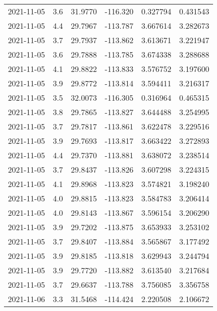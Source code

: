 \begin{tabular}{lrrrrr}
2021-11-05 &       3.6 &  31.9770 &  -116.320 &         0.327794 &         0.431543 \\
2021-11-05 &       4.4 &  29.7967 &  -113.787 &         3.667614 &         3.282673 \\
2021-11-05 &       3.7 &  29.7937 &  -113.862 &         3.613671 &         3.221947 \\
2021-11-05 &       3.6 &  29.7888 &  -113.785 &         3.674338 &         3.288688 \\
2021-11-05 &       4.1 &  29.8822 &  -113.833 &         3.576752 &         3.197600 \\
2021-11-05 &       3.9 &  29.8772 &  -113.814 &         3.594411 &         3.216317 \\
2021-11-05 &       3.5 &  32.0073 &  -116.305 &         0.316964 &         0.465315 \\
2021-11-05 &       3.8 &  29.7865 &  -113.827 &         3.644488 &         3.254995 \\
2021-11-05 &       3.7 &  29.7817 &  -113.861 &         3.622478 &         3.229516 \\
2021-11-05 &       3.9 &  29.7693 &  -113.817 &         3.663422 &         3.272893 \\
2021-11-05 &       4.4 &  29.7370 &  -113.881 &         3.638072 &         3.238514 \\
2021-11-05 &       3.7 &  29.8437 &  -113.826 &         3.607298 &         3.224315 \\
2021-11-05 &       4.1 &  29.8968 &  -113.823 &         3.574821 &         3.198240 \\
2021-11-05 &       4.0 &  29.8815 &  -113.823 &         3.584783 &         3.206414 \\
2021-11-05 &       4.0 &  29.8143 &  -113.867 &         3.596154 &         3.206290 \\
2021-11-05 &       3.9 &  29.7202 &  -113.875 &         3.653933 &         3.253102 \\
2021-11-05 &       3.7 &  29.8407 &  -113.884 &         3.565867 &         3.177492 \\
2021-11-05 &       3.9 &  29.8185 &  -113.818 &         3.629943 &         3.244794 \\
2021-11-05 &       3.9 &  29.7720 &  -113.882 &         3.613540 &         3.217684 \\
2021-11-05 &       3.7 &  29.6637 &  -113.788 &         3.756085 &         3.356758 \\
2021-11-06 &       3.3 &  31.5468 &  -114.424 &         2.220508 &         2.106672 \\

\end{tabular}
